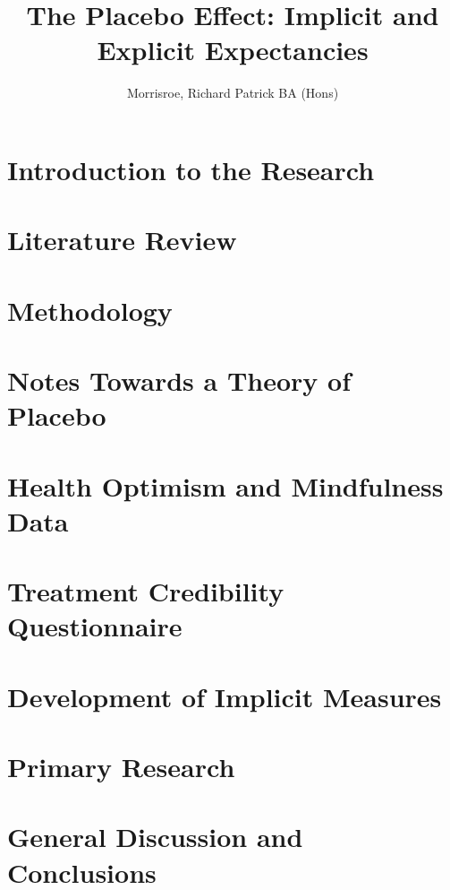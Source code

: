\documentclass[apsych, phd]{uccthesis}
\title{The Placebo Effect: Implicit and Explicit Expectancies}
\author{Morrisroe, Richard Patrick BA (Hons)}
\begin{document}
\maketitle



\tableofcontents

\chapter{Introduction to the Research}
\label{cha:intr-rese}


\chapter{Literature Review}
\label{cha:literature-review}


\chapter{Methodology}
\label{cha:methodology}



\chapter{Notes Towards a Theory of Placebo}
\label{cha:notes-towards-theory}




\chapter{Health Optimism and Mindfulness Data}
\label{cha:health-for-thesis}

\chapter{Treatment Credibility Questionnaire}
\label{cha:tcqthesis}


\chapter{Development of Implicit Measures}
\label{cha:devel-impl-meas}

\label{cha:development-of-iats}
\chapter{Primary Research}
\label{cha:primary-research}
\label{cha:primary-research-1}

\chapter{General Discussion and Conclusions}
\label{cha:general-discussion}




\end{document}
